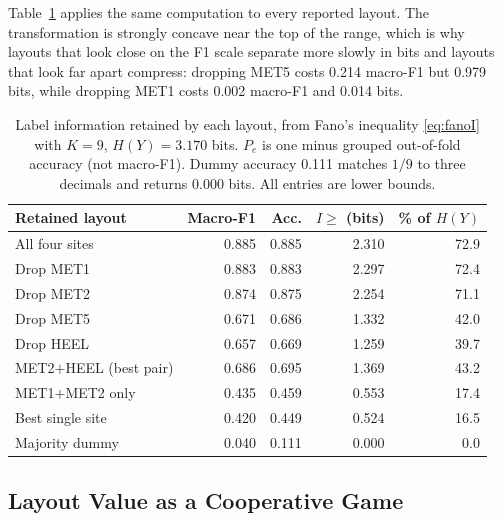 \documentclass[10pt,conference,a4paper]{IEEEtran}
\begin{document}
Table~\ref{tab:fano} applies the same computation to every reported layout.
The transformation is strongly concave near the top of the range, which is why
layouts that look close on the F1 scale separate more slowly in bits and
layouts that look far apart compress: dropping MET5 costs 0.214 macro-F1 but
0.979 bits, while dropping MET1 costs 0.002 macro-F1 and 0.014 bits.

\begin{table}[!t]
\caption{Label information retained by each layout, from Fano's inequality
\eqref{eq:fanoI} with $K=9$, $H(Y)=3.170$ bits. $P_e$ is one minus grouped
out-of-fold accuracy (not macro-F1). Dummy accuracy 0.111 matches $1/9$ to three
decimals and returns 0.000 bits. All entries are lower bounds.}
\label{tab:fano}
\centering
\renewcommand{\arraystretch}{1.1}
\setlength{\tabcolsep}{4pt}
\scriptsize
\begin{tabular}{@{}lrrrr@{}}
\toprule
Retained layout & Macro-F1 & Acc. & $I\ge$ (bits) & \% of $H(Y)$ \\
\midrule
All four sites        & 0.885 & 0.885 & 2.310 & 72.9 \\
Drop MET1             & 0.883 & 0.883 & 2.297 & 72.4 \\
Drop MET2             & 0.874 & 0.875 & 2.254 & 71.1 \\
Drop MET5             & 0.671 & 0.686 & 1.332 & 42.0 \\
Drop HEEL             & 0.657 & 0.669 & 1.259 & 39.7 \\
MET2$+$HEEL (best pair) & 0.686 & 0.695 & 1.369 & 43.2 \\
MET1$+$MET2 only      & 0.435 & 0.459 & 0.553 & 17.4 \\
Best single site      & 0.420 & 0.449 & 0.524 & 16.5 \\
Majority dummy        & 0.040 & 0.111 & 0.000 & \phantom{0}0.0 \\
\bottomrule
\end{tabular}
\end{table}

\subsection{Layout Value as a Cooperative Game}
\label{sec:game}
\end{document}
